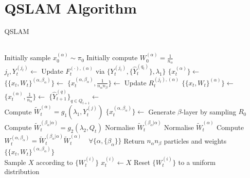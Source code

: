 \section{QSLAM Algorithm}

\begin{algorithm}[H] %
	\caption{QSLAM}\label{algorithm:q-slam-pf}
	\begin{algorithmic}[0] 
		\\
		\State Initially sample $x_{0}^{(\alpha)} \sim \pi_0$ 
		\State Initially compute $W_0^{(\alpha)} = \frac{1}{n_\alpha}$
		\EndFor
		\EndProcedure 
		\EndIf
		\\
		\State $j_t, Y_t^{(j_t)} \gets$ 
		\EndIf
		\State Update $F_t^{(\cdot), (\alpha)}$ via $ \{Y_t^{(j_t)},  \{\hat{Y}_t^{(q_t)}\}, \lambda_1\} $
		\State $\{x_{t}^{(\alpha)}\} \gets $ 
		\State $\{\{x_t, W_t\}^{(\alpha, \beta_\alpha)}\} \gets $ 
		\State $\{x_t^{(\alpha, \beta_\alpha)}, \frac{1}{n_\alpha n_\beta}\} \gets $ 
		\State Update $R_t^{(j_t), (\alpha)}$
		\State $\{\{x_t, W_t\}^{(\alpha)}\} \gets$ 
		\State $\{x_t^{(\alpha)}, \frac{1}{n_\alpha}\} \gets $ 
		\EndFor
		\State $\{\hat{Y}_{t+1}^{(q)}\}_{q\in Q_{t+1}} \gets $ 
		\EndWhile \label{pseudoalgo:qslamr:endwhile2}			
		\EndProcedure
		\\ \dotfill
		\State Compute $\tilde{W}_t^{( \alpha )} = g_1(\lambda_1, Y_t^{(j)}) $ 
		\State $\{x_t^{(\alpha, \beta_\alpha)}\} \gets $  Generate $\beta$-layer by sampling $R_0$ 
		\State Compute $\tilde{W}_t^{( \beta_\alpha | \alpha)} = g_2(\lambda_2, Q_t) $
		\EndFor
		\State Normalise $\tilde{W}_t^{( \beta_\alpha | \alpha)}$
		\EndFor
		\State Normalise $\tilde{W}_t^{( \alpha)}$
		\State Compute $W_t^{(\alpha, \beta_\alpha)} =  \tilde{W}_t^{( \beta_\alpha | \alpha)} \tilde{W}_t^{( \alpha)} \quad \forall \{\alpha, \{\beta_\alpha\} \}$
		\State Return $ n_\alpha n_\beta $ particles and weights $\{\{x_t, W_t\}^{(\alpha, \beta_\alpha)}\}$		
		\EndFunction 
		\\ \dotfill
		\State Sample $X$  according to $\{W_t^{(i)}\}$
		\State $x_t^{(i)} \gets X$
		\EndFor
		\State Reset $\{W_t^{(i)}\}$ to a uniform distribution
		\EndFunction 
	\end{algorithmic}	
\end{algorithm}


